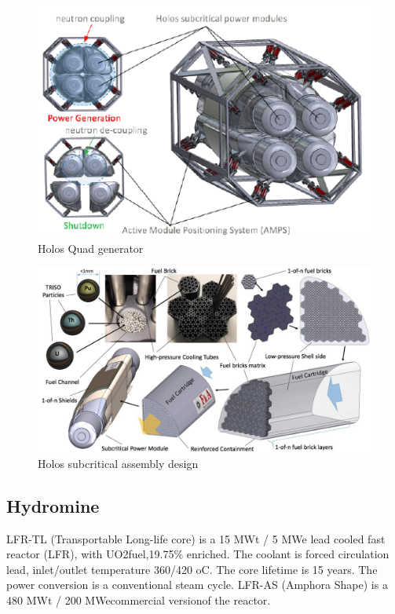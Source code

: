 \begin{figure}[hbtp]
\centering
\includegraphics[scale=1]{Figs/holosquad.jpeg}
\caption{Holos Quad generator}
\label{Holosquad}
\end{figure}

\begin{figure}[hbtp]
\centering
\includegraphics[scale=0.3]{Figs/holosfueldesign.jpeg}
\caption{Holos subcritical assembly design}
\label{Holosdesign}
\end{figure}

\pagebreak

\subsection{Hydromine}
LFR-TL (Transportable Long-life core) is a 15 MWt / 5 MWe lead cooled fast reactor (LFR), with UO2fuel,19.75\% enriched. The coolant is forced circulation lead, inlet/outlet temperature 360/420 oC. The core lifetime is 15 years. The power conversion is a conventional steam cycle. LFR-AS (Amphora Shape) is a 480 MWt / 200 MWecommercial versionof the reactor.

